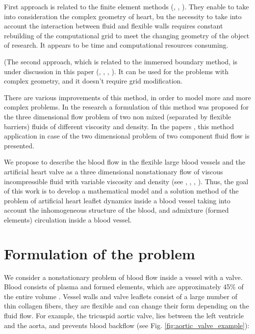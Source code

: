 \documentclass[runningheads,a4paper]{llncs}
\begin{document}
First approach is related to the finite element methods (\cite{taylor}, \cite{zhang}, \cite{black}). They enable to take into consideration
the complex geometry of heart, bu the necessity to take into account the interaction between fluid and flexible walls
requires constant rebuilding of the computational grid to meet the changing geometry of the object of research.
It appears to be time and computational resources consuming.

(The second approach, which is related to the immersed boundary method, is under discussion in this paper (\cite{pescin_1977},
\cite{boyce_2011}, \cite{ma_x_2013}, \cite{pilhwa_2010}). It can be used for the problems with complex geometry, and it doesn't
require grid modification.

There are various improvements of this method, in order to model more and more complex problems. In the research \cite{fai_2013}
a formulation of this method was proposed for the three dimensional flow problem of two non mixed (separated by flexible barriers)
fluids of different viscosity and density. In the papers \cite{jian}, \cite{lee} this method application in case of the two dimensional 
problem of two component fluid flow is presented.

We propose to describe the blood flow in the flexible large blood vessels and the artificial heart valve as a three dimensional
nonstationary flow of viscous incompressible fluid with variable viscosity and density (see \cite{gummel}, \cite{geidarov},
\cite{milosevic}, \cite{dolgov}). Thus, the goal of this work is to develop a mathematical model and a solution method of the problem
of artificial heart leaflet dynamics inside a blood vessel taking into account the inhomogeneous structure of the blood, and 
admixture (formed elements) circulation inside a blood vessel.

\section{Formulation of the problem}

We consider a nonstationary problem of blood flow inside a vessel with a valve. Blood consists of plasma and formed elements, which are approximately
45\% of the entire volume \cite{caro}. Vessel walls and valve leaflets consist of a large number of thin collagen fibers, they are flexible
and can change their form depending on the fluid flow. For example, the tricuspid aortic valve, lies between the left ventricle and the aorta, and 
prevents blood backflow (see Fig. \ref{fig:aortic_valve_example}):
\end{document}
